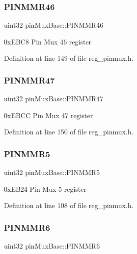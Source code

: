 \subsubsection{\texorpdfstring{P\+I\+N\+M\+M\+R46}{PINMMR46}}
{\footnotesize\ttfamily uint32 pin\+Mux\+Base\+::\+P\+I\+N\+M\+M\+R46}

0x\+E\+B\+C8 Pin Mux 46 register 

Definition at line 149 of file reg\+\_\+pinmux.\+h.

\mbox{\label{structpinMuxBase_a7ffd2b02d8ccd6b070ee508d5af04746}} 
\subsubsection{\texorpdfstring{P\+I\+N\+M\+M\+R47}{PINMMR47}}
{\footnotesize\ttfamily uint32 pin\+Mux\+Base\+::\+P\+I\+N\+M\+M\+R47}

0x\+E\+B\+CC Pin Mux 47 register 

Definition at line 150 of file reg\+\_\+pinmux.\+h.

\mbox{\label{structpinMuxBase_ade4675e7bdf64172fbc00436b24a9323}} 
\subsubsection{\texorpdfstring{P\+I\+N\+M\+M\+R5}{PINMMR5}}
{\footnotesize\ttfamily uint32 pin\+Mux\+Base\+::\+P\+I\+N\+M\+M\+R5}

0x\+E\+B24 Pin Mux 5 register 

Definition at line 108 of file reg\+\_\+pinmux.\+h.

\mbox{\label{structpinMuxBase_a026fd6b8134b125e845278080b6887bd}} 
\subsubsection{\texorpdfstring{P\+I\+N\+M\+M\+R6}{PINMMR6}}
{\footnotesize\ttfamily uint32 pin\+Mux\+Base\+::\+P\+I\+N\+M\+M\+R6}

